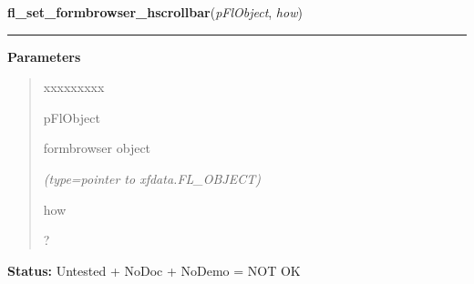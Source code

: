 \hspace{.8\funcindent}\begin{boxedminipage}{\funcwidth}

    \raggedright \textbf{fl\_set\_formbrowser\_hscrollbar}(\textit{pFlObject}, \textit{how})

    \vspace{-1.5ex}

    \rule{\textwidth}{0.5\fboxrule}
\setlength{\parskip}{2ex}
\setlength{\parskip}{1ex}
      \textbf{Parameters}
      \vspace{-1ex}

      \begin{quote}
        \begin{Ventry}{xxxxxxxxx}

          \item[pFlObject]

          formbrowser object

            {\it (type=pointer to xfdata.FL\_OBJECT)}

          \item[how]

          ?

        \end{Ventry}

      \end{quote}

\textbf{Status:} Untested + NoDoc + NoDemo = NOT OK



    \end{boxedminipage}

    \label{xformslib:flformbrowser:fl_set_formbrowser_vscrollbar}

    \vspace{0.5ex}

